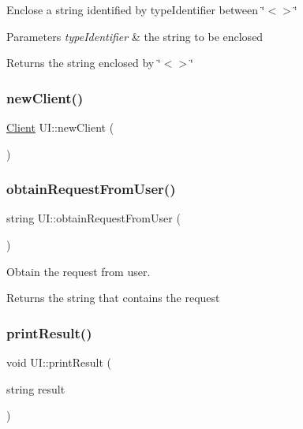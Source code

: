 Enclose a string identified by type\+Identifier between \char`\"{}$<$$>$\char`\"{} 
\begin{DoxyParams}{Parameters}
{\em type\+Identifier} & the string to be enclosed \\
\hline
\end{DoxyParams}
\begin{DoxyReturn}{Returns}
the string enclosed by \char`\"{}$<$$>$\char`\"{} 
\end{DoxyReturn}
\mbox{\label{classUI_acdfe48d32141de368744ddd75d41d82d}} 
\subsubsection{\texorpdfstring{new\+Client()}{newClient()}}
{\footnotesize\ttfamily \mbox{\hyperlink{classClient}{Client}} U\+I\+::new\+Client (\begin{DoxyParamCaption}{ }\end{DoxyParamCaption})\hspace{0.3cm}{\ttfamily [private]}}

\mbox{\label{classUI_a343fa5043d1f649ee433647539a721f0}} 
\subsubsection{\texorpdfstring{obtain\+Request\+From\+User()}{obtainRequestFromUser()}}
{\footnotesize\ttfamily string U\+I\+::obtain\+Request\+From\+User (\begin{DoxyParamCaption}{ }\end{DoxyParamCaption})\hspace{0.3cm}{\ttfamily [private]}}

Obtain the request from user. \begin{DoxyReturn}{Returns}
the string that contains the request 
\end{DoxyReturn}
\mbox{\label{classUI_aad7a4761b32253e43dcb76429deefcd3}} 
\subsubsection{\texorpdfstring{print\+Result()}{printResult()}}
{\footnotesize\ttfamily void U\+I\+::print\+Result (\begin{DoxyParamCaption}\item[{string}]{result }\end{DoxyParamCaption})\hspace{0.3cm}{\ttfamily [private]}}

